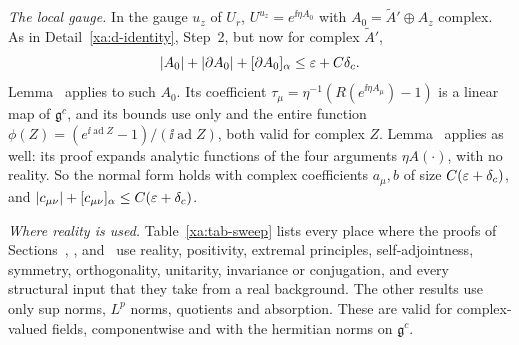\begin{detail}\label{xa:d-step-ii}
\emph{The local gauge.} In the gauge $u_z$ of $U_r$, $U^{u_z}=e^{\ii\eta A_0}$ with $A_0=\tilde A'\oplus A_z$ complex. As in Detail~\ref{xa:d-identity}, Step~2, but now for complex $\tilde A'$,
\[
\lvert A_0\rvert+\lvert\partial A_0\rvert+[\partial A_0]_\alpha\le\varepsilon+C\delta_c .
\]
Lemma~ applies to such $A_0$. Its coefficient $\tau_\mu=\eta^{-1}(R(e^{\ii\eta A_\mu})-1)$ is a linear map of $\mathfrak g^c$, and its bounds use only  and the entire function $\phi(Z)=(e^{\ii\operatorname{ad}Z}-1)/(\ii\operatorname{ad}Z)$, both valid for complex $Z$. Lemma~ applies as well: its proof expands analytic functions of the four arguments $\eta A(\cdot)$, with no reality. So the normal form  holds with complex coefficients $a_\mu,b$ of size $C(\varepsilon+\delta_c)$, and $\lvert c_{\mu\nu}\rvert+[c_{\mu\nu}]_\alpha\le C(\varepsilon+\delta_c)$.

\emph{Where reality is used.} Table~\ref{xa:tab-sweep} lists every place where the proofs of Sections~, ,  and~ use reality, positivity, extremal principles, self-adjointness, symmetry, orthogonality, unitarity, invariance or conjugation, and every structural input that they take from a real background. The other results use only sup norms, $L^p$ norms, quotients and absorption. These are valid for complex-valued fields, componentwise and with the hermitian norms on $\mathfrak g^c$.


\end{detail}
